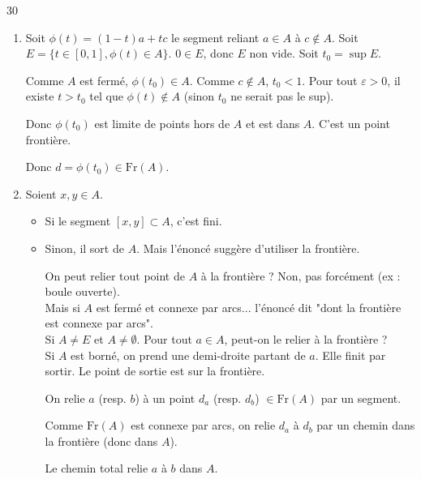 \begin{correction}{30}
\begin{enumerate}
    \item Soit $\phi(t) = (1-t)a + tc$ le segment reliant $a \in A$ à $c \notin A$.
        Soit $E = \{ t \in [0,1], \phi(t) \in A \}$. $0 \in E$, donc $E$ non vide.
        Soit $t_{0} = \sup E$.

        Comme $A$ est fermé, $\phi(t_{0}) \in A$.
        Comme $c \notin A$, $t_{0} < 1$.
        Pour tout $\varepsilon > 0$, il existe $t > t_{0}$ tel que $\phi(t) \notin A$
        (sinon $t_{0}$ ne serait pas le sup).

        Donc $\phi(t_{0})$ est limite de points hors de $A$ et est dans $A$.
        C'est un point frontière.

        Donc $d = \phi(t_{0}) \in \text{Fr}(A)$.

    \item Soient $x, y \in A$.
        \begin{itemize}
        \item 
            Si le segment $[x,y] \subset A$, c'est fini.
        \item
            Sinon, il sort de $A$. Mais l'énoncé suggère d'utiliser la frontière.

            On peut relier tout point de $A$ à la frontière ? Non, pas forcément (ex : boule ouverte). \\
            Mais si $A$ est fermé et connexe par arcs... l'énoncé dit "dont la frontière est connexe par arcs". \\

            Si $A \neq E$ et $A \neq \emptyset$.
            Pour tout $a \in A$, peut-on le relier à la frontière ? \\

            Si $A$ est borné, on prend une demi-droite partant de $a$.
            Elle finit par sortir. Le point de sortie est sur la frontière.

            On relie $a$ (resp. $b$) à un point $d_{a}$ (resp. $d_{b}$) $\in \text{Fr}(A)$ par un segment.

            Comme $\text{Fr}(A)$ est connexe par arcs, on relie $d_{a}$ à $d_{b}$ par un chemin dans la frontière (donc dans $A$).

            Le chemin total relie $a$ à $b$ dans $A$.
        \end{itemize}
        
\end{enumerate}
\end{correction}

